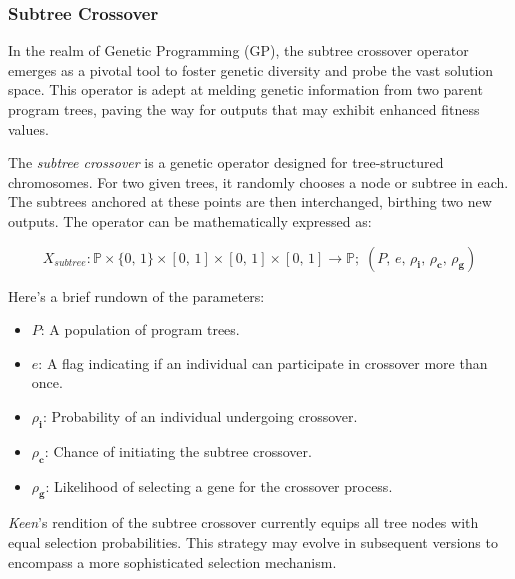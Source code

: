\subsubsection{Subtree Crossover}
\label{sec:keen:gp:op:cx:subtree}
  In the realm of Genetic Programming (GP), the subtree crossover operator
  emerges as a pivotal tool to foster genetic diversity and probe the vast 
  solution space. This operator is adept at melding genetic information from 
  two parent program trees, paving the way for outputs that may exhibit 
  enhanced fitness values.

  \begin{definition}
    The \textit{subtree crossover} is a genetic operator designed for 
    tree-structured chromosomes. For two given trees, it randomly chooses a 
    node or subtree in each. The subtrees anchored at these points are then 
    interchanged, birthing two new outputs. The operator can be mathematically 
    expressed as:

    \begin{equation}
      X_{subtree}: \mathbb{P} \times \{0,\, 1\} \times [0,\, 1] 
        \times [0,\, 1] \times [0,\, 1] \to \mathbb{P};\; 
        (P,\, e,\, \rho_\mathbf{i},\, \rho_\mathbf{c},\, \rho_\mathbf{g})
    \end{equation}

    Here's a brief rundown of the parameters:

    \begin{itemize}
      \item \(P\): A population of program trees.
      \item \(e\): A flag indicating if an individual can participate in 
        crossover more than once.
      \item \(\rho_\mathbf{i}\): Probability of an individual undergoing 
        crossover.
      \item \(\rho_\mathbf{c}\): Chance of initiating the subtree crossover.
      \item \(\rho_\mathbf{g}\): Likelihood of selecting a gene for the 
        crossover process.
    \end{itemize}
  \end{definition}

  \begin{remark}
    \textit{Keen}'s rendition of the subtree crossover currently equips all 
    tree nodes with equal selection probabilities. This strategy may evolve 
    in subsequent versions to encompass a more sophisticated selection 
    mechanism.
  \end{remark}

